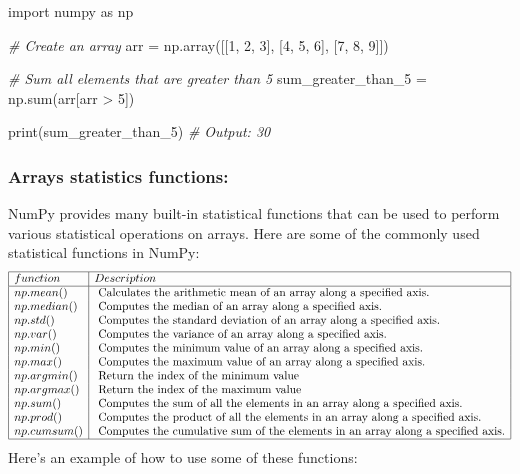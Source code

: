 \documentclass[11pt]{article}
\newenvironment{Shaded}{}{}
\newcommand{\DecValTok}[1]{\textcolor[rgb]{0.25,0.63,0.44}{{#1}}}
\newcommand{\CommentTok}[1]{\textcolor[rgb]{0.38,0.63,0.69}{\textit{{#1}}}}
\newcommand{\NormalTok}[1]{{#1}}
\newcommand{\ImportTok}[1]{{#1}}
\newcommand{\OperatorTok}[1]{\textcolor[rgb]{0.40,0.40,0.40}{{#1}}}
\newcommand{\BuiltInTok}[1]{{#1}}
\begin{document}
\begin{Shaded}
\begin{Highlighting}[]
\ImportTok{import}\NormalTok{ numpy }\ImportTok{as}\NormalTok{ np}

\CommentTok{\# Create an array}
\NormalTok{arr }\OperatorTok{=}\NormalTok{ np.array([[}\DecValTok{1}\NormalTok{, }\DecValTok{2}\NormalTok{, }\DecValTok{3}\NormalTok{], [}\DecValTok{4}\NormalTok{, }\DecValTok{5}\NormalTok{, }\DecValTok{6}\NormalTok{], [}\DecValTok{7}\NormalTok{, }\DecValTok{8}\NormalTok{, }\DecValTok{9}\NormalTok{]])}

\CommentTok{\# Sum all elements that are greater than 5}
\NormalTok{sum\_greater\_than\_5 }\OperatorTok{=}\NormalTok{ np.}\BuiltInTok{sum}\NormalTok{(arr[arr }\OperatorTok{\textgreater{}} \DecValTok{5}\NormalTok{])}

\BuiltInTok{print}\NormalTok{(sum\_greater\_than\_5) }\CommentTok{\# Output: 30}
\end{Highlighting}
\end{Shaded}

\hypertarget{arrays-statistics-functions}{%
\subsubsection{Arrays statistics
functions:}\label{arrays-statistics-functions}}

NumPy provides many built-in statistical functions that can be used to
perform various statistical operations on arrays. Here are some of the
commonly used statistical functions in NumPy:
$$
\begin{array}{|l|l|}
  \hline
function &  Description\\
\hline
np.mean() &\text{ Calculates the arithmetic mean of an array along a specified
axis.} \\
np.median() &\text{ Computes the median of an array along a specified axis.} \\
np.std() &\text{ Computes the standard deviation of an array along a specified
axis.} \\
np.var() &\text{ Computes the variance of an array along a specified axis.} \\
np.min() &\text{ Computes the minimum value of an array along a specified
axis.} \\
np.max() &\text{ Computes the maximum value of an array along a specified
axis.} \\
np.argmin() &\text{ Return the index of the minimum value} \\
np.argmax() &\text{ Return the index of the maximum value} \\
np.sum() &\text{ Computes the sum of all the elements in an array along a
specified axis.} \\
np.prod() &\text{ Computes the product of all the elements in an array along a
specified axis.} \\
np.cumsum() &\text{ Computes the cumulative sum of the elements in an array
along a specified axis.} \\
\hline
\end{array}
$$
Here's an example of how to use some of these functions:
\end{document}
